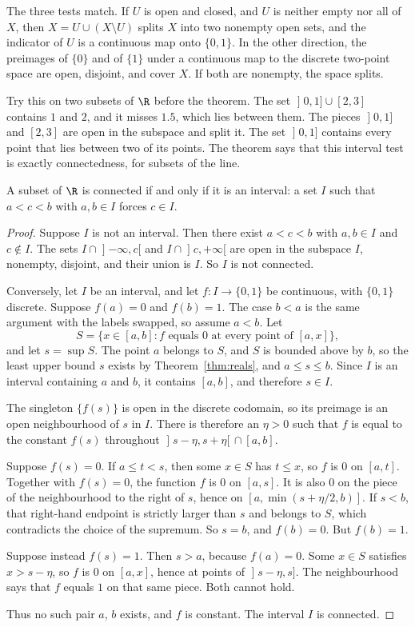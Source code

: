 The three tests match. If $U$ is open and closed, and $U$ is neither empty nor all of $X$, then $X=U\cup(X\setminus U)$ splits $X$ into two nonempty open sets, and the indicator of $U$ is a continuous map onto $\{0,1\}$. In the other direction, the preimages of $\{0\}$ and of $\{1\}$ under a continuous map to the discrete two-point space are open, disjoint, and cover $X$. If both are nonempty, the space splits.

Try this on two subsets of $\R$ before the theorem. The set $\mathopen]0,1]\cup[2,3]$ contains $1$ and $2$, and it misses $1.5$, which lies between them. The pieces $\mathopen]0,1]$ and $[2,3]$ are open in the subspace and split it. The set $\mathopen]0,1]$ contains every point that lies between two of its points. The theorem says that this interval test is exactly connectedness, for subsets of the line.

\begin{theorem}\label{thm:intervals}
A subset of $\R$ is connected if and only if it is an interval: a set $I$ such that $a<c<b$ with $a,b\in I$ forces $c\in I$.
\end{theorem}
\begin{proof}
Suppose $I$ is not an interval. Then there exist $a<c<b$ with $a,b\in I$ and $c\notin I$. The sets $I\cap\mathopen]-\infty,c[$ and $I\cap\mathopen]c,+\infty[$ are open in the subspace $I$, nonempty, disjoint, and their union is $I$. So $I$ is not connected.

Conversely, let $I$ be an interval, and let $f:I\to\{0,1\}$ be continuous, with $\{0,1\}$ discrete. Suppose $f(a)=0$ and $f(b)=1$. The case $b<a$ is the same argument with the labels swapped, so assume $a<b$. Let
\[
S=\{x\in[a,b]:f\text{ equals }0\text{ at every point of }[a,x]\},
\]
and let $s=\sup S$. The point $a$ belongs to $S$, and $S$ is bounded above by $b$, so the least upper bound $s$ exists by Theorem~\ref{thm:reals}, and $a\le s\le b$. Since $I$ is an interval containing $a$ and $b$, it contains $[a,b]$, and therefore $s\in I$.

The singleton $\{f(s)\}$ is open in the discrete codomain, so its preimage is an open neighbourhood of $s$ in $I$. There is therefore an $\eta>0$ such that $f$ is equal to the constant $f(s)$ throughout $\mathopen]s-\eta,s+\eta[\,\cap[a,b]$.

Suppose $f(s)=0$. If $a\le t<s$, then some $x\in S$ has $t\le x$, so $f$ is $0$ on $[a,t]$. Together with $f(s)=0$, the function $f$ is $0$ on $[a,s]$. It is also $0$ on the piece of the neighbourhood to the right of $s$, hence on $[a,\min(s+\eta/2,b)]$. If $s<b$, that right-hand endpoint is strictly larger than $s$ and belongs to $S$, which contradicts the choice of the supremum. So $s=b$, and $f(b)=0$. But $f(b)=1$.

Suppose instead $f(s)=1$. Then $s>a$, because $f(a)=0$. Some $x\in S$ satisfies $x>s-\eta$, so $f$ is $0$ on $[a,x]$, hence at points of $\mathopen]s-\eta,s]$. The neighbourhood says that $f$ equals $1$ on that same piece. Both cannot hold.

Thus no such pair $a$, $b$ exists, and $f$ is constant. The interval $I$ is connected.
\end{proof}

